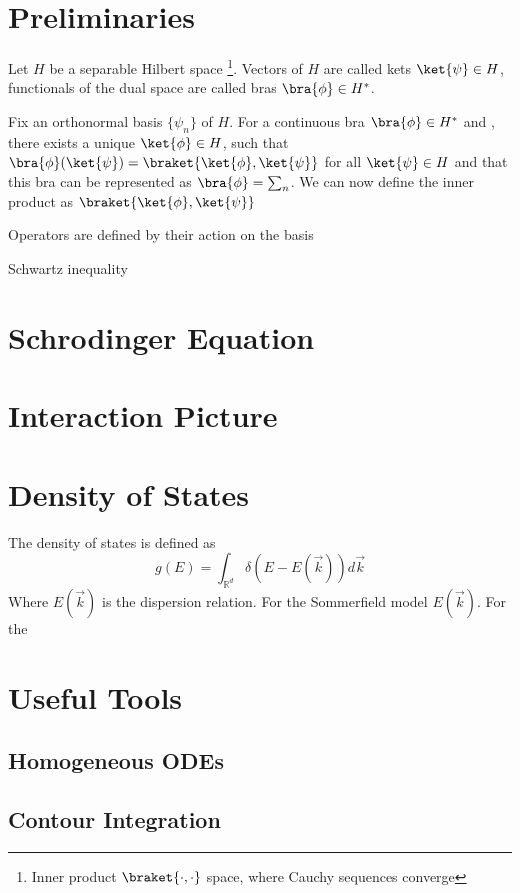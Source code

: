 \section{Preliminaries}
Let $H$ be a separable Hilbert space \footnote{Inner product $\braket{\cdot,\cdot}$ space, where Cauchy sequences converge}. Vectors of $H$ are called kets $\ket{\psi} \in H$, functionals of the dual space are called bras $\bra{\phi} \in H^\ast$.

Fix an orthonormal basis $\{ \psi_n \}$ of $H$. For a continuous bra $\bra{\phi} \in H^\ast$ and , there exists a unique $\ket{\phi} \in H$, such that $\bra{\phi}(\ket{\psi})=\braket{\ket{\phi},\ket{\psi}}$ for all $\ket{\psi} \in H$ and that this bra can be represented as $\bra{\phi} = \sum_n $. We can now define the inner product as $\braket{\ket{\phi},\ket{\psi}}$

Operators are defined by their action on the basis

Schwartz inequality

\section{Schrodinger Equation}

\section{Interaction Picture}

\section{Density of States}
The density of states is defined as
\begin{equation}
g(E) = \int_{\mathbb{R}^d}\delta(E-E(\Vec{k}))d\Vec{k}
\end{equation}
Where $E(\Vec{k})$ is the dispersion relation.
For the Sommerfield model $E(\Vec{k})$. For the
\section{Useful Tools}
\subsection{Homogeneous ODEs}
\subsection{Contour Integration}